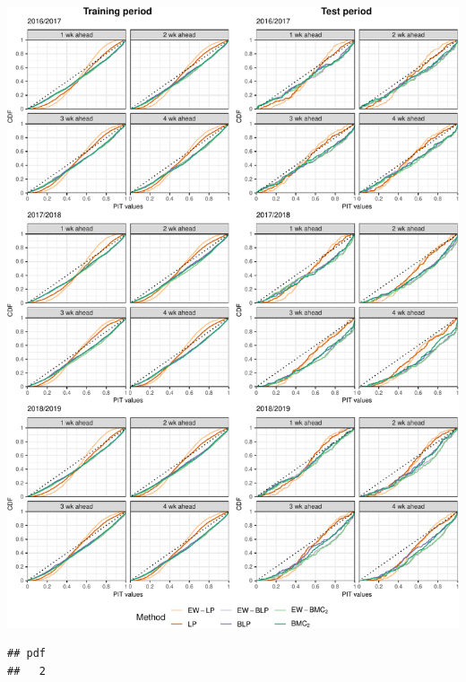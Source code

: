 \documentclass[
]{article}
\begin{document}
\begin{center}\includegraphics[width=576px]{plot_calibration_files/figure-latex/reli_sup_all-1} \end{center}

\begin{verbatim}
## pdf 
##   2
\end{verbatim}
\end{document}
